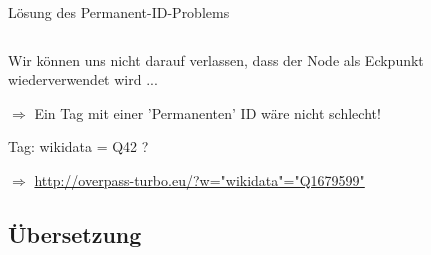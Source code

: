 \documentclass{beamer}
\begin{document}
\begin{frame}{Lösung des Permanent-ID-Problems}
\begin{columns}[c]
  \end{columns}
 \vspace*{0.2cm}

  \pause

  Wir können uns nicht darauf verlassen, dass der Node als Eckpunkt wiederverwendet wird ... \pause
 \vspace*{0.2cm}
  
  $\Rightarrow$ Ein Tag mit einer 'Permanenten' ID wäre nicht schlecht! \pause
 \vspace*{0.2cm}

  Tag: wikidata = Q42 ?

  $\Rightarrow$ \href{http://overpass-turbo.eu/?w=\%22wikidata\%22\%3D\%22Q1679599\%22+global\&R}{http://overpass-turbo.eu/?w="wikidata"="Q1679599"}

\end{frame}

\subsection{Übersetzung}
\end{document}
